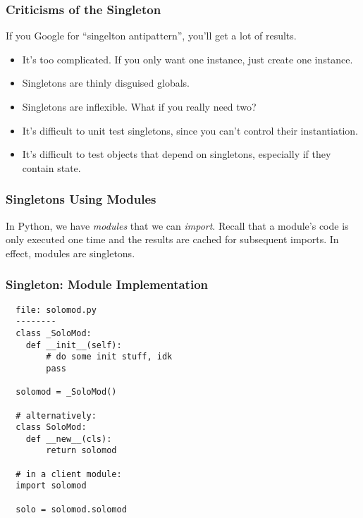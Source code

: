 \documentclass[10pt]{beamer}
\begin{document}
\begin{frame}
  \frametitle{Criticisms of the Singleton}
  If you Google for ``singelton antipattern'', you'll get a lot of results.
  \begin{itemize}
    \item It's too complicated. If you only want one instance, just create one instance.
    \item Singletons are thinly disguised globals.
    \item Singletons are inflexible. What if you really need two?
    \item It's difficult to unit test singletons, since you can't control their instantiation.
    \item It's difficult to test objects that depend on singletons, especially if they contain state.
  \end{itemize}      
\end{frame}

\begin{frame}
  \frametitle{Singletons Using Modules}
  In Python, we have \emph{modules} that we can \emph{import}. Recall that a module's
  code is only executed one time and the results are cached for subsequent imports. In effect,
  modules are singletons.
\end{frame} 

\begin{frame}[fragile]
  \frametitle{Singleton: Module Implementation}

  \begin{verbatim}
  file: solomod.py
  --------
  class _SoloMod:
    def __init__(self):
        # do some init stuff, idk
        pass
  
  solomod = _SoloMod()  
  
  # alternatively:    
  class SoloMod:
    def __new__(cls):
        return solomod
        
  # in a client module:
  import solomod
  
  solo = solomod.solomod
     
  \end{verbatim}
\end{frame}
\end{document}
